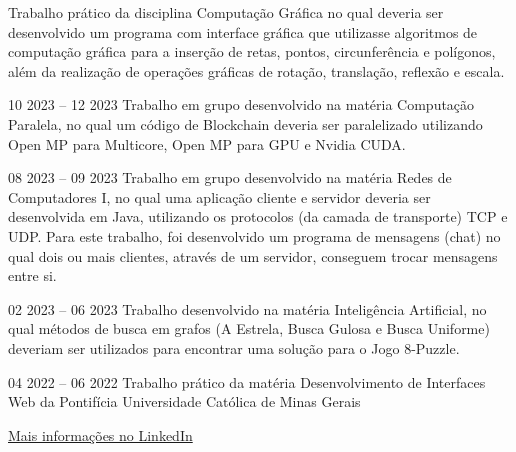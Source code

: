 \documentclass[10pt,a4paper,ragged2e,withhyper]{altacv}
\begin{document}
\begin{paracol}{2}
            Trabalho prático da disciplina Computação Gráfica no qual deveria ser desenvolvido um programa com interface gráfica que utilizasse algoritmos de computação gráfica para a inserção de retas, pontos, circunferência e polígonos, além da realização de operações gráficas de rotação, translação, reflexão e escala.\\
            \divider

            {
            }{10 2023 -- 12 2023}{}
            Trabalho em grupo desenvolvido na matéria Computação Paralela, no qual um código de Blockchain deveria ser paralelizado utilizando Open MP para Multicore, Open MP para GPU e Nvidia CUDA.\\
            \divider

            {
            }{08 2023 -- 09 2023}{}
            Trabalho em grupo desenvolvido na matéria Redes de Computadores I, no qual uma aplicação cliente e servidor deveria ser desenvolvida em Java, utilizando os protocolos (da camada de transporte) TCP e UDP. Para este trabalho, foi desenvolvido um programa de mensagens (chat) no qual dois ou mais clientes, através de um servidor, conseguem trocar mensagens entre si.\\
            \divider
        
            {
            }{02 2023 -- 06 2023}{}
            Trabalho desenvolvido na matéria Inteligência Artificial, no qual métodos de busca em grafos (A Estrela, Busca Gulosa e Busca Uniforme) deveriam ser utilizados para encontrar uma solução para o Jogo 8-Puzzle.\\
            \divider
            
            {
            }{04 2022 -- 06 2022}{}
            Trabalho prático da matéria Desenvolvimento de Interfaces Web da Pontifícia Universidade Católica de Minas Gerais\\
            \divider

        {\large\color{emphasis}\href{https://www.linkedin.com/in/henriquemcc/details/projects/}{Mais informações no LinkedIn}}
    \end{paracol}
\end{document}
